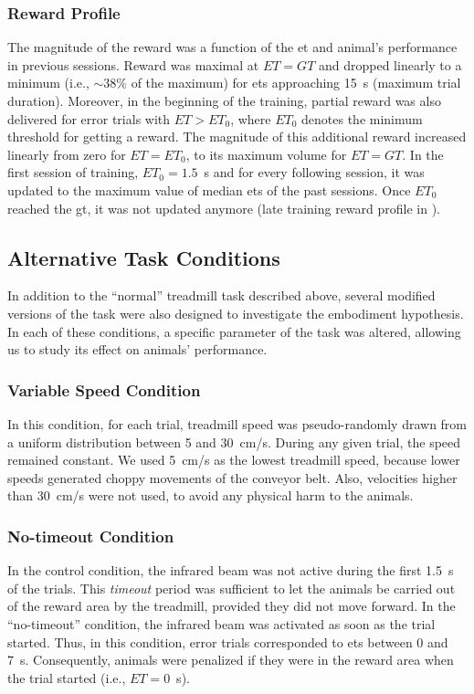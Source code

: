 \subsubsection{Reward Profile} \label{ch:methods:reward}
The magnitude of the reward was a function of the \gls{et} and animal's performance in previous sessions.
Reward was maximal at $ET=GT$ and dropped linearly to a minimum (i.e., $\sim 38\%$ of the maximum) for \glspl{et} approaching 15~s (maximum trial duration).
Moreover, in the beginning of the training, partial reward was also delivered for error trials with $ET>ET_0$, where $ET_0$ denotes the minimum threshold for getting a reward.
The magnitude of this additional reward increased linearly from zero for $ET=ET_0$, to its maximum volume for $ET=GT$.
In the first session of training, $ET_0=1.5$~s and for every following session, it was updated to the maximum value of median \glspl{et} of the past sessions.
Once $ET_0$ reached the \gls{gt}, it was not updated anymore (late training reward profile in ).

\subsection{Alternative Task Conditions}
In addition to the ``normal'' treadmill task described above, several modified versions of the task were also designed to investigate the embodiment hypothesis.
In each of these conditions, a specific parameter of the task was altered, allowing us to study its effect on animals' performance.

\subsubsection{Variable Speed Condition}
In this condition, for each trial, treadmill speed was pseudo-randomly drawn from a uniform distribution between 5 and 30~cm/s.
During any given trial, the speed remained constant.
We used 5~cm/s as the lowest treadmill speed, because lower speeds generated choppy movements of the conveyor belt.
Also, velocities higher than 30~cm/s were not used, to avoid any physical harm to the animals.

\subsubsection{No-timeout Condition}
In the control condition, the infrared beam was not active during the first 1.5~s of the trials. 
This \emph{timeout} period was sufficient to let the animals be carried out of the reward area by the treadmill, provided they did not move forward.
In the ``no-timeout'' condition, the infrared beam was activated as soon as the trial started.
Thus, in this condition, error trials corresponded to \glspl{et} between 0 and 7~s.
Consequently, animals were penalized if they were in the reward area when the trial started (i.e., $ET=0$~s).

